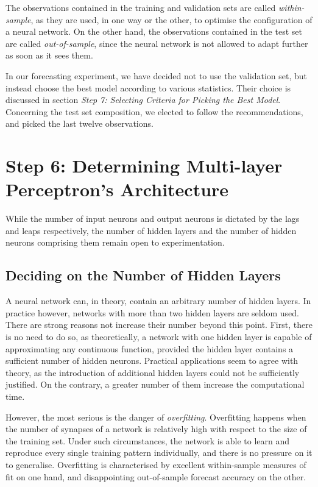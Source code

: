 The observations contained in the training and validation sets are called \textit{within-sample}, as they are used, in one way or the other, to optimise the configuration of a neural network. On the other hand, the observations contained in the test set are called \textit{out-of-sample}, since the neural network is not allowed to adapt further as soon as it sees them.

In our forecasting experiment, we have decided not to use the validation set, but instead choose the best model according to various statistics. Their choice is discussed in section \textit{Step 7: Selecting Criteria for Picking the Best Model}. Concerning the test set composition, we elected to follow the recommendations, and picked the last twelve observations.

\section{Step 6: Determining Multi-layer Perceptron's Architecture}

While the number of input neurons and output neurons is dictated by the lags and leaps respectively, the number of hidden layers and the number of hidden neurons comprising them remain open to experimentation.

\subsection{Deciding on the Number of Hidden Layers}

A neural network can, in theory, contain an arbitrary number of hidden layers. In practice however, networks with more than two hidden layers are seldom used. There are strong reasons not increase their number beyond this point. First, there is no need to do so, as theoretically, a network with one hidden layer is capable of approximating any continuous function, provided the hidden layer contains a sufficient number of hidden neurons. Practical applications seem to agree with theory, as the introduction of additional hidden layers could not be sufficiently justified. On the contrary, a greater number of them increase the computational time.

However, the most serious is the danger of \textit{overfitting}. Overfitting happens when the number of synapses of a network is relatively high with respect to the size of the training set. Under such circumstances, the network is able to learn and reproduce every single training pattern individually, and there is no pressure on it to generalise. Overfitting is characterised by excellent within-sample measures of fit on one hand, and disappointing out-of-sample forecast accuracy on the other.

